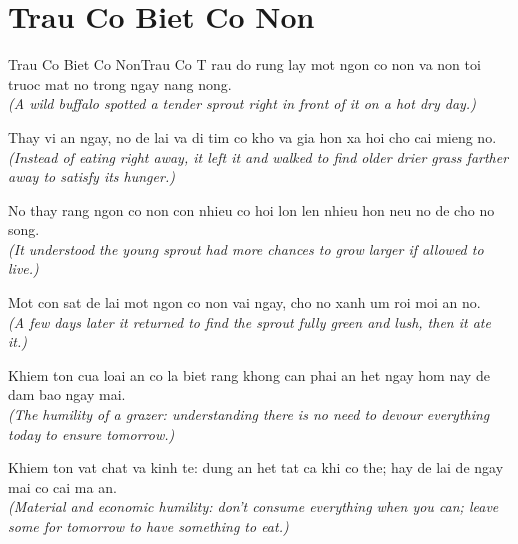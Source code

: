 \section{Trau Co Biet Co Non}
\begin{truyen}{Trau Co Biet Co Non}{Trau Co}
T rau do rung lay mot ngon co non va non toi truoc mat no trong ngay nang nong.\\
\textit{(A wild buffalo spotted a tender sprout right in front of it on a hot dry day.)}

Thay vi an ngay, no de lai va di tim co kho va gia hon xa hoi cho cai mieng no.\\
\textit{(Instead of eating right away, it left it and walked to find older drier grass farther away to satisfy its hunger.)}

No thay rang ngon co non con nhieu co hoi lon len nhieu hon neu no de cho no song.\\
\textit{(It understood the young sprout had more chances to grow larger if allowed to live.)}

Mot con sat de lai mot ngon co non vai ngay, cho no xanh um roi moi an no.\\
\textit{(A few days later it returned to find the sprout fully green and lush, then it ate it.)}

Khiem ton cua loai an co la biet rang khong can phai an het ngay hom nay de dam bao ngay mai.\\
\textit{(The humility of a grazer: understanding there is no need to devour everything today to ensure tomorrow.)}

\end{truyen}
\begin{baihoc}
  Khiem ton vat chat va kinh te: dung an het tat ca khi co the; hay de lai de ngay mai co cai ma an.\\
  \textit{(Material and economic humility: don't consume everything when you can; leave some for tomorrow to have something to eat.)}
\end{baihoc}


